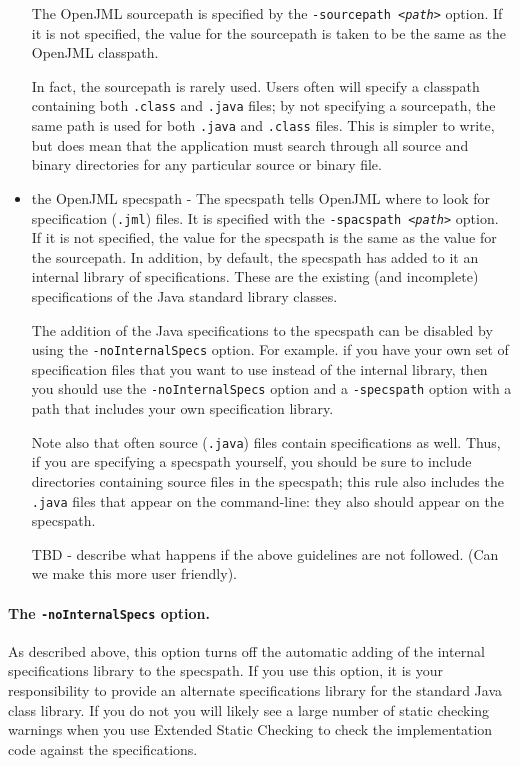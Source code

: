\documentclass{report}%
\begin{document}
\begin{itemize}
The OpenJML sourcepath is specified by the {\tt -sourcepath {\it <path>}} option. If it is not specified, the value for the sourcepath is taken to be the same as the OpenJML classpath.

In fact, the sourcepath is rarely used.  Users often will specify a classpath containing both {\tt .class} and {\tt .java} files; by 
not specifying a sourcepath, the same path is used for both {\tt .java} and {\tt .class} files. This is simpler to write, but does mean
that the application must search through all source and binary directories for any particular source or binary file.

\item the OpenJML specspath - The specspath tells OpenJML where to look for specification ({\tt .jml}) files. It is specified with the {\tt -spacspath {\it <path>}} option. If it is not specified, the value for the specspath is the same as the value for the sourcepath.  In addition, by default, the specspath
has added to it an internal library of specifications.  These are the existing (and incomplete) specifications of the Java standard library classes.

The addition of the Java specifications to the specspath can be disabled by using the {\tt -noInternalSpecs} option.  For example. if you
have your own set of specification files that you want to use instead of the internal library, then you should use the {\tt -noInternalSpecs} option and a {\tt -specspath} option with a path that includes your own specification library.

Note also that often source ({\tt .java}) files contain specifications as well. Thus, if you are specifying a specspath yourself, you should
be sure to include directories containing source files in the specspath; this rule also includes the {\tt .java} files that appear on the 
command-line: they also should appear on the specspath.

TBD - describe what happens if the above guidelines are not followed. (Can we make this more user friendly).

\end{itemize}

\paragraph{The {\tt -noInternalSpecs} option.} As described above, this option turns off the automatic adding of the internal specifications library to the specspath. If you use this option, it is your responsibility to provide an alternate specifications library for the standard
Java class library. If you do not you will likely see a large number of static checking warnings when you use Extended Static Checking to check the implementation code against the specifications.
\end{document}
